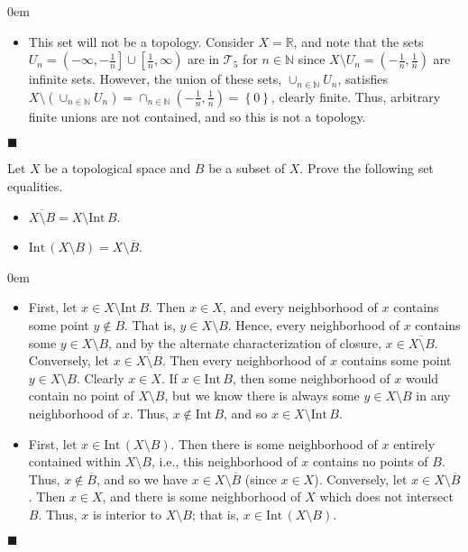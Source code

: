 \documentclass[12pt]{article}
\renewcommand{\qed}{\hfill$\blacksquare$}
\renewenvironment{proof}{\begin{addmargin}[1em]{0em}\begin{newproof}}{\end{newproof}\end{addmargin}\qed}
\newenvironment{problem}[2][Problem]{\begin{trivlist}
\item[\hskip \labelsep {\bfseries #1}\hskip \labelsep {\bfseries #2.}]}{\end{trivlist}}
\begin{document}
\begin{proof}
\begin{itemize}
	\item This set will not be a topology. Consider $X=\mathbb{R}$, and note that the sets $U_n=\left(-\infty, -\frac{1}{n}\right]\cup\left[\frac{1}{n},\infty\right)$ are in $\mathcal{T}_5$ for $n\in \mathbb{N}$ since $X\setminus U_n = \left(-\frac{1}{n},\frac{1}{n}\right)$ are infinite sets. However, the union of these sets, $\cup_{n \in \mathbb{N}} U_n$, satisfies $X\setminus \left(\cup_{n \in \mathbb{N}}U_n \right) = \cap_{n\in \mathbb{N}} \left(-\frac{1}{n},\frac{1}{n}\right)=\left\{0\right\}$, clearly finite. Thus, arbitrary finite unions are not contained, and so this is not a topology.
\end{itemize}
\end{proof}









\begin{problem}{2-3}
	Let $X$ be a topological space and $B$ be a subset of $X$. Prove the following set equalities.
	\begin{itemize}
		\item $\overline{X\setminus B} = X\setminus \text{Int}\,B$.
		\item $\text{Int}\,\left(X\setminus B\right) = X \setminus \overline{B}$.
	\end{itemize}
\end{problem}
\begin{proof}
\begin{itemize}
	\item First, let $x \in X\setminus \text{Int}\,B$. Then $x\in X$, and every neighborhood of $x$ contains some point $y \notin B$. That is, $y \in X\setminus B$. Hence, every neighborhood of $x$ contains some $y \in X\setminus B$, and by the alternate characterization of closure, $x\in \overline{X\setminus B}$.
	Conversely, let $x\in \overline{X\setminus B}$. Then every neighborhood of $x$ contains some point $y \in X\setminus B$. Clearly $x\in X$. If $x\in \text{Int}\,B$, then some neighborhood of $x$ would contain no point of $X\setminus B$, but we know there is always some $y\in X\setminus B$ in any neighborhood of $x$. Thus, $x\notin \text{Int}\,B$, and so $x \in X\setminus \text{Int}\,B$.
	\item First, let $x \in \text{Int}\,\left(X\setminus B\right)$. Then there is some neighborhood of $x$ entirely contained within $X\setminus B$, i.e., this neighborhood of $x$ contains no points of $B$. Thus, $x\notin \overline{B}$, and so we have $x\in X\setminus \overline{B}$ (since $x\in X$).
	Conversely, let $x\in X\setminus \overline{B}$. Then $x\in X$, and there is some neighborhood of $X$ which does not intersect $B$. Thus, $x$ is interior to $X\setminus B$; that is, $x \in \text{Int}\,\left(X\setminus B\right)$.
\end{itemize}
\end{proof}
\end{document}
